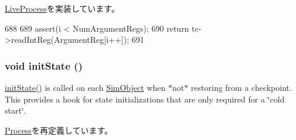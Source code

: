 \hyperlink{classLiveProcess_aa001ff57ec460026facb89ba19c7bf96}{LiveProcess}を実装しています。


\begin{DoxyCode}
688 {
689     assert(i < NumArgumentRegs);
690     return tc->readIntReg(ArgumentReg[i++]);
691 }
\end{DoxyCode}
\hypertarget{classX86ISA_1_1X86__64LiveProcess_a3c34ea9b29f410748d4435a667484924}{
\subsubsection[{initState}]{\setlength{\rightskip}{0pt plus 5cm}void initState ()}}
\label{classX86ISA_1_1X86__64LiveProcess_a3c34ea9b29f410748d4435a667484924}
\hyperlink{classX86ISA_1_1X86__64LiveProcess_a3c34ea9b29f410748d4435a667484924}{initState()} is called on each \hyperlink{classSimObject}{SimObject} when $\ast$not$\ast$ restoring from a checkpoint. This provides a hook for state initializations that are only required for a \char`\"{}cold start\char`\"{}. 

\hyperlink{classProcess_a3c34ea9b29f410748d4435a667484924}{Process}を再定義しています。


